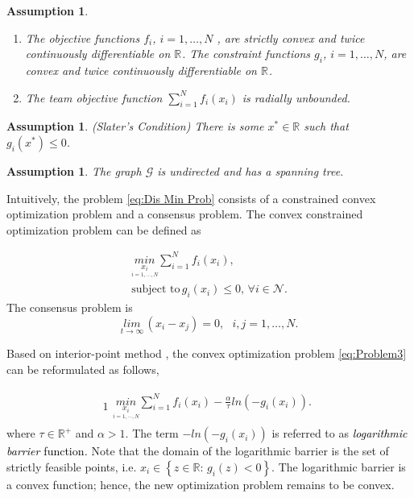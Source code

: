 \documentclass[letterpaper, 10 pt, conference]{ieeeconf}  %
\newtheorem{assumption}[theorem]{Assumption}
\begin{document}
{\begin{assumption}
\begin{enumerate}
	\item[a.]  The objective functions $f_{i}$, $i=1,\dots,N$ , are strictly
	convex  and twice  continuously differentiable on
	$\mathbb{R^{\text{}}}$. The constraint functions $g_{i}$, $i=1,\dots,N$,
	are convex and twice continuously differentiable on $\mathbb{R^{\text{}}}$.
	\item[b.] The team objective function $\sum_{i=1}^{N}f_{i}(x_{i})$ is radially
	unbounded.
\end{enumerate}
\end{assumption}

\begin{assumption}\label{assum:2}
\textit{(Slater's Condition)} There is some $x^{*}\in\mathbb{R}$
such that $g_{i}(x^{*})\leq0$.
\end{assumption}

\begin{assumption}\label{assum:3}
The graph $\mathcal{{G}}$ is undirected and
has a spanning tree.
\end{assumption}


Intuitively, the problem \eqref{eq:Dis Min Prob} consists of a constrained
convex optimization problem and a consensus problem. The convex constrained
optimization problem can be defined as

\begin{equation}
\begin{array}{c}
\underset{\underset{i=1,\dots,N}{x_{i}}}{min}\sum_{i=1}^{N}f_{i}(x_{i}),\,\\
\text{subject to}\,g_{i}(x_{i})\leq0,\,\forall i\in\mathcal{{N}}.
\end{array}\label{eq:Problem3}
\end{equation}
The consensus problem is
\begin{equation}
\underset{{\scriptstyle t\rightarrow\infty}}{lim}\,(x_{i}-x_{j})=0,\,\,\,\,i,j=1,\ldots,N.\label{eq:consensusProb}
\end{equation}






Based on interior-point method \cite{boyd2004convex}, the convex
optimization problem \eqref{eq:Problem3} can be reformulated as follows,

\begin{alignat}{1}
\begin{array}{c}
\underset{\underset{i=1,\cdots,N}{x_{i}}}{min}\sum_{i=1}^{N}f_{i}(x_{i})-{\displaystyle \frac{\alpha}{\tau}}ln\left(-g_{i}(x_{i})\right).\end{array}\label{eq:1BarrierProb1}
\end{alignat}
where $\tau\in\mathbb{{R}}^{+}$ and $\alpha>1$. The term $-ln\left(-g_{i}(x_{i})\right)$
is referred to as \textit{\textcolor{black}{logarithmic barrier }}\textcolor{black}{function}\textit{\textcolor{black}{.}}
Note that the domain of the logarithmic barrier is the set of strictly
feasible points, i.e. $x_{i}\in\left\{ z\in\mathbb{{R}}:\,g_{i}(z)<0\right\} $.
The logarithmic barrier is a convex function; hence, the new optimization
problem remains to be convex.

}
\end{document}
